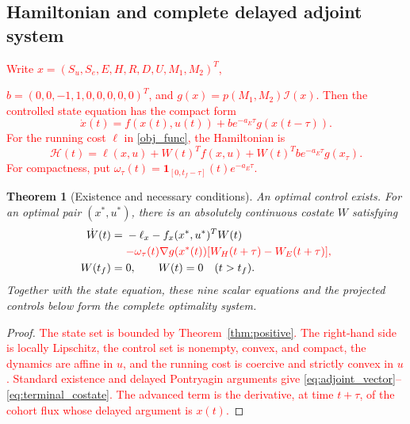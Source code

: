 \documentclass[letterpaper,journal]{IEEEtran}
\newtheorem{theorem}{Theorem}[section]
\begin{document}
	\subsection{Hamiltonian and complete delayed adjoint system}
	\textcolor{red}{
	Write $x=(S_u,S_e,E,H,R,D,U,M_1,M_2)^T$, }
	
	\textcolor{red}{
	\noindent
	$b=(0,0,-1,1,0,0,0,0,0)^T$, and
	$g(x)=p(M_1,M_2)\mathcal I(x)$. Then the controlled state equation has the compact form
	\begin{equation*}
	\dot x(t)=f(x(t),u(t))+b e^{-a_E\tau}g(x(t-\tau)).
	\end{equation*}
	For the running cost $\ell$ in \eqref{obj_func}, the Hamiltonian is
	\begin{equation}
	\mathscr H(t)=\ell(x,u)+W(t)^Tf(x,u)+W(t)^Tb e^{-a_E\tau}g(x_\tau).
	\label{eq:hamiltonian}
	\end{equation}
	}
	\textcolor{red}{
	For compactness, put
	$\omega_\tau(t)=\mathbf 1_{[0,t_f-\tau]}(t)e^{-a_E\tau}$.
	}

	\begin{theorem}[Existence and necessary conditions]
		An optimal control exists. For an optimal pair $(x^*,u^*)$, there is an absolutely continuous costate $W$ satisfying
		\begin{align}
		\dot W(t)={}&-\ell_x-f_x(x^*,u^*)^TW(t)\nonumber\\
		&\textcolor{red}{-\omega_\tau(t)\nabla g(x^*(t))
		[W_H(t+\tau)-W_E(t+\tau)],}
		\label{eq:adjoint_vector}\\
		W(t_f)={}&0,\qquad W(t)=0\quad(t>t_f).
		\label{eq:terminal_costate}
		\end{align}
		Together with the state equation, these nine scalar equations and the projected controls below form the complete optimality system.
	\end{theorem}
	\begin{proof}
		\textcolor{red}{The state set is bounded by Theorem~\ref{thm:positive}. The right-hand side is locally Lipschitz, the control set is nonempty, convex, and compact, the dynamics are affine in $u$, and the running cost is coercive and strictly convex in $u$. Standard existence and delayed Pontryagin arguments \cite{lenhart2007optimal,belhdid2024optimal} give \eqref{eq:adjoint_vector}--\eqref{eq:terminal_costate}. The advanced term is the derivative, at time $t+\tau$, of the cohort flux whose delayed argument is $x(t)$.}
	\end{proof}
\end{document}
